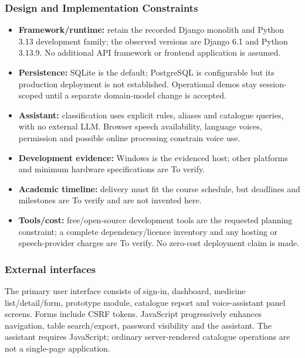 \documentclass[11pt,a4paper]{article}
\begin{document}
\subsubsection{Design and Implementation Constraints}
\begin{itemize}
\item \textbf{Framework/runtime:} retain the recorded Django monolith and Python 3.13 development family; the observed versions are Django 6.1 and Python 3.13.9. No additional API framework or frontend application is assumed.
\item \textbf{Persistence:} SQLite is the default; PostgreSQL is configurable but its production deployment is not established. Operational demos stay session-scoped until a separate domain-model change is accepted.
\item \textbf{Assistant:} classification uses explicit rules, aliases and catalogue queries, with no external LLM. Browser speech availability, language voices, permission and possible online processing constrain voice use.
\item \textbf{Development evidence:} Windows is the evidenced host; other platforms and minimum hardware specifications are To verify.
\item \textbf{Academic timeline:} delivery must fit the course schedule, but deadlines and milestones are To verify and are not invented here.
\item \textbf{Tools/cost:} free/open-source development tools are the requested planning constraint; a complete dependency/licence inventory and any hosting or speech-provider charges are To verify. No zero-cost deployment claim is made.
\end{itemize}

\subsubsection{External interfaces}
The primary user interface consists of sign-in, dashboard, medicine list/detail/form, prototype module, catalogue report and voice-assistant panel screens. Forms include CSRF tokens. JavaScript progressively enhances navigation, table search/export, password visibility and the assistant. The assistant requires JavaScript; ordinary server-rendered catalogue operations are not a single-page application.
\end{document}
